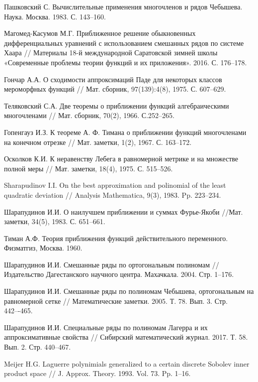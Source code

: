 \begin{thebibliography}{111}
{Пашковский С.} Вычислительные применения многочленов и рядов Чебышева. Наука. Москва. 1983. С. 143--160.


{Магомед-Касумов М.Г.}
 Приближенное решение обыкновенных дифференциальных уравнений с использованием смешанных рядов по системе Хаара
// Материалы 18-й международной Саратовской зимней школы «Современные проблемы теории функций и их приложения». 2016. С. 176--178.


{Гончар А.А.}
 О сходимости аппроксимаций Паде для некоторых классов мероморфных функций
// Мат. сборник, 97(139):4(8), 1975. С. 607--629.


{Теляковский С.А.}
 Две теоремы о приближении функций алгебраическими многочленами
// Мат. сборник, 70(2), 1966. С.252--265.


{Гопенгауз И.З.}
 К теореме А. Ф. Тимана о приближении функций многочленами на конечном отрезке
// Мат. заметки, 1(2), 1967. С. 163--172.


{Осколков К.И.}
 К неравенству Лебега в равномерной метрике и на множестве полной меры
// Мат.  заметки, 18(4), 1975. С. 515--526.


{Sharapudinov I.I.}
 On the best approximation and polinomial of the least quadratic deviation
// Analysis Mathematica, 9(3), 1983. Pp. 223--234.


{Шарапудинов И.И.}
 О наилучшем приближении и суммах Фурье-Якоби
//Мат. заметки, 34(5), 1983. С. 651--661.


{Тиман А.Ф.} Теория приближения функций действительного переменного. Физматгиз, Москва. 1960.


{Шарапудинов И.И.}
Смешанные ряды по ортогональным полиномам // Издательство Дагестанского научного центра. Махачкала. 2004. Стр. 1--176.


{Шарапудинов И.И.}
Смешанные ряды по полиномам Чебышева, ортогональным на равномерной сетке // Математические заметки. 2005. Т. 78. Вып. 3. Стр. 442–-465.


{Шарапудинов И.И.}
Специальные ряды по полиномам Лагерра и их аппроксимативные свойства // Сибирский математический журнал. 2017. Т. 58. Вып. 2. Стр. 440--467.


{Meijer H.G.}
Laguerre polynimials generalized to a certain discrete Sobolev inner product space // J. Approx. Theory. 1993. Vol. 73. Pp. 1--16.



\end{thebibliography}
